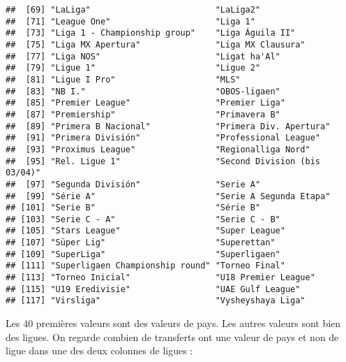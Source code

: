 \documentclass[]{article}
\newenvironment{Shaded}{\begin{snugshade}}{\end{snugshade}}
\newcommand{\DecValTok}[1]{\textcolor[rgb]{0.00,0.00,0.81}{#1}}
\newcommand{\KeywordTok}[1]{\textcolor[rgb]{0.13,0.29,0.53}{\textbf{#1}}}
\newcommand{\NormalTok}[1]{#1}
\newcommand{\OperatorTok}[1]{\textcolor[rgb]{0.81,0.36,0.00}{\textbf{#1}}}
\newcommand{\StringTok}[1]{\textcolor[rgb]{0.31,0.60,0.02}{#1}}
\begin{document}
\begin{verbatim}
##  [69] "LaLiga"                         "LaLiga2"                       
##  [71] "League One"                     "Liga 1"                        
##  [73] "Liga 1 - Championship group"    "Liga Águila II"                
##  [75] "Liga MX Apertura"               "Liga MX Clausura"              
##  [77] "Liga NOS"                       "Ligat ha'Al"                   
##  [79] "Ligue 1"                        "Ligue 2"                       
##  [81] "Ligue I Pro"                    "MLS"                           
##  [83] "NB I."                          "OBOS-ligaen"                   
##  [85] "Premier League"                 "Premier Liga"                  
##  [87] "Premiership"                    "Primavera B"                   
##  [89] "Primera B Nacional"             "Primera Div. Apertura"         
##  [91] "Primera División"               "Professional League"           
##  [93] "Proximus League"                "Regionalliga Nord"             
##  [95] "Rel. Ligue 1"                   "Second Division (bis 03/04)"   
##  [97] "Segunda División"               "Serie A"                       
##  [99] "Série A"                        "Serie A Segunda Etapa"         
## [101] "Serie B"                        "Série B"                       
## [103] "Serie C - A"                    "Serie C - B"                   
## [105] "Stars League"                   "Super League"                  
## [107] "Süper Lig"                      "Superettan"                    
## [109] "SuperLiga"                      "Superligaen"                   
## [111] "Superligaen Championship round" "Torneo Final"                  
## [113] "Torneo Inicial"                 "U18 Premier League"            
## [115] "U19 Eredivisie"                 "UAE Gulf League"               
## [117] "Virsliga"                       "Vysheyshaya Liga"
\end{verbatim}

Les 40 premières valeurs sont des valeurs de pays. Les autres valeurs
sont bien des ligues. On regarde combien de transferts ont une valeur de
pays et non de ligue dans une des deux colonnes de ligues :

\begin{Shaded}
\end{Shaded}
\end{document}
